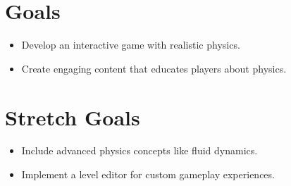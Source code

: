 \documentclass{article}
\begin{document}
\section{Goals}
\begin{itemize}
    \item Develop an interactive game with realistic physics.
    \item Create engaging content that educates players about physics.
\end{itemize}

\section{Stretch Goals}
\begin{itemize}
    \item Include advanced physics concepts like fluid dynamics.
    \item Implement a level editor for custom gameplay experiences.
\end{itemize}

\end{document}
